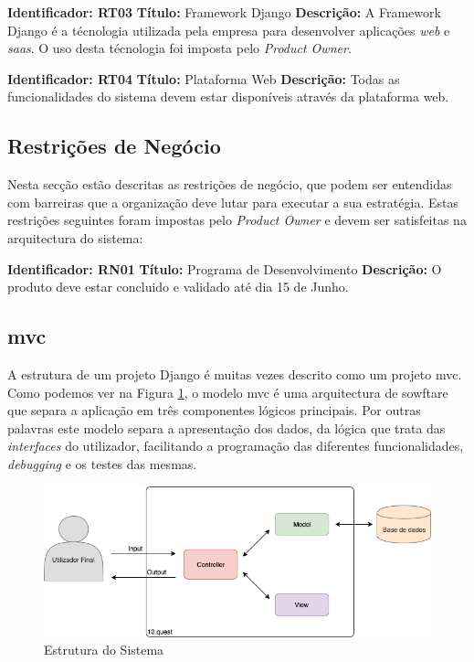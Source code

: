 \textbf{Identificador: RT03}
\newline
\textbf{Título:} Framework Django\cite{django}
\newline
\textbf{Descrição:} A Framework Django é a técnologia utilizada pela empresa para desenvolver aplicações \textit{web} e \textit{\acrshort{saas}}. O uso desta técnologia foi imposta pelo \textit{Product Owner}.

\textbf{Identificador: RT04}
\newline
\textbf{Título:} Plataforma Web
\newline
\textbf{Descrição:} Todas as funcionalidades do sistema devem estar disponíveis através da plataforma web.

\subsection{Restrições de Negócio}
Nesta secção estão descritas as restrições de negócio, que podem ser entendidas com barreiras que a organização deve lutar para executar a sua estratégia. Estas restrições seguintes foram impostas pelo \textit{Product Owner} e devem ser satisfeitas na arquitectura do sistema:

\textbf{Identificador: RN01}
\newline
\textbf{Título:} Programa de Desenvolvimento
\newline
\textbf{Descrição:} O produto deve estar concluido e validado até dia 15 de Junho.



\subsection{\acrfull{mvc}}

A estrutura de um projeto Django é muitas vezes descrito como um projeto \acrshort{mvc}. Como podemos ver na Figura \ref{fig:arq-mvc}, o modelo \acrshort{mvc} é uma arquitectura de sowftare que separa a aplicação em três componentes lógicos principais. Por outras palavras este modelo separa a apresentação dos dados, da lógica que trata das \textit{interfaces} do utilizador, facilitando a programação das diferentes funcionalidades, \textit{debugging} e os testes das mesmas.

\begin{figure}[ht!]
	\begin{center}
		\includegraphics[width=1\textwidth]{img/arq/diagrama-MVC}
		\caption{Estrutura do Sistema}
		\label{fig:arq-mvc}
	\end{center}
\end{figure}

